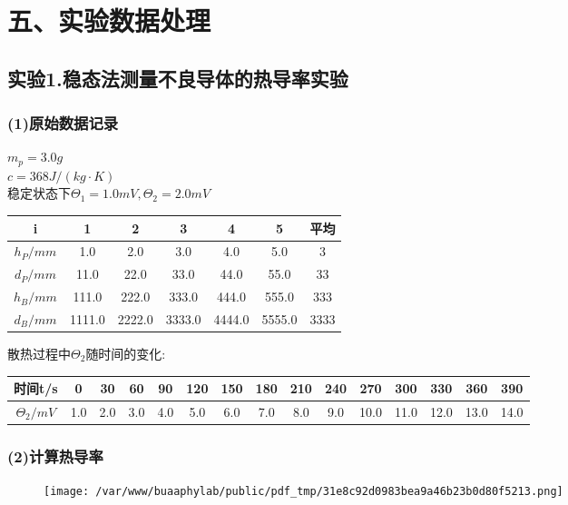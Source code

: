 \documentclass[11pt,a4paper,oneside]{article}
\begin{document}
\section*{五、实验数据处理}
\subsection*{实验1.稳态法测量不良导体的热导率实验}
\subsubsection*{(1)原始数据记录}

\noindent
$m_p = 3.0g$ \\
$c = 368 J/(kg\cdot K)$ \\ 
稳定状态下$\displaystyle \Theta_1 = 1.0mV, \Theta_2 = 2.0mV$ \\
\begin{center}
\begin{tabular}{|c|c|c|c|c|c|c|}
\hline
i & 1 &2 &3 &4 &5 & 平均 \\
\hline
$h_P/mm$ & 1.0 &2.0 &3.0 &4.0 &5.0 & 3 \\
\hline
$d_P/mm$ & 11.0 &22.0 &33.0 &44.0 &55.0 & 33 \\
\hline
$h_B/mm$ & 111.0 &222.0 &333.0 &444.0 &555.0 & 333 \\
\hline
$d_B/mm$ & 1111.0 &2222.0 &3333.0 &4444.0 &5555.0 & 3333 \\
\hline
\end{tabular} 
\end{center}

散热过程中$\Theta_2$随时间的变化:

\begin{center}
\begin{tabular}{|c|c|c|c|c|c|c|c|c|c|c|c|c|c|c|}
\hline
时间t/s & 0& 30& 60& 90& 120& 150& 180& 210& 240& 270& 300& 330& 360& 390 \\
\hline
$\Theta_2/mV$ & 1.0& 2.0& 3.0& 4.0& 5.0& 6.0& 7.0& 8.0& 9.0& 10.0& 11.0& 12.0& 13.0& 14.0 \\
\hline
\end{tabular} 
\end{center}

\subsubsection*{(2)计算热导率}
\noindent
\begin{figure}[H]
 \centering
  \texttt{[image: /var/www/buaaphylab/public/pdf\_tmp/31e8c92d0983bea9a46b23b0d80f5213.png]}
\end{figure}
\end{document}
